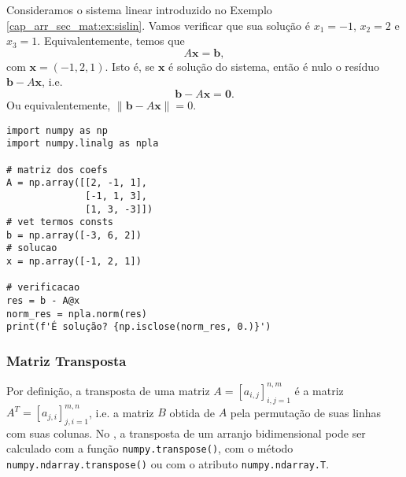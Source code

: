 \begin{ex}
  Consideramos o sistema linear introduzido no Exemplo \ref{cap_arr_sec_mat:ex:sislin}. Vamos verificar que sua solução é $x_1 = -1$, $x_2 = 2$ e $x_3 = 1$. Equivalentemente, temos que
  \begin{equation}
    A\pmb{x} = \pmb{b},
  \end{equation}
  com $\pmb{x} = (-1, 2, 1)$. Isto é, se $\pmb{x}$ é solução do sistema, então é nulo o resíduo $\pmb{b} - A\pmb{x}$, i.e.
  \begin{equation}
    \pmb{b} - A\pmb{x} = \pmb{0}.
  \end{equation}
  Ou equivalentemente, $\|\pmb{b} - A\pmb{x}\| = 0$.

\begin{lstlisting}
import numpy as np
import numpy.linalg as npla

# matriz dos coefs
A = np.array([[2, -1, 1],
              [-1, 1, 3],
              [1, 3, -3]])
# vet termos consts
b = np.array([-3, 6, 2])
# solucao
x = np.array([-1, 2, 1])

# verificacao
res = b - A@x
norm_res = npla.norm(res)
print(f'É solução? {np.isclose(norm_res, 0.)}')
\end{lstlisting}

\end{ex}

\subsubsection{Matriz Transposta}

Por definição, a transposta de uma matriz $A = [a_{i,j}]_{i,j=1}^{n,m}$ é a matriz $A^T = [a_{j,i}]_{j,i=1}^{m,n}$, i.e. a matriz $B$ obtida de $A$ pela permutação de suas linhas com suas colunas. No {\numpy}, a transposta de um arranjo bidimensional pode ser calculado com a função \lstinline+numpy.transpose()+, com o método \lstinline+numpy.ndarray.transpose()+ ou com o atributo \lstinline+numpy.ndarray.T+.

